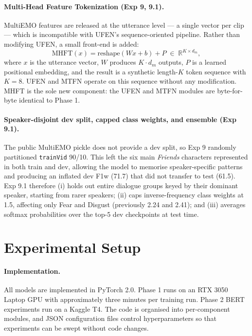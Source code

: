 \documentclass[11pt,twocolumn]{article}
\begin{document}
\paragraph{Multi-Head Feature Tokenization (Exp 9, 9.1).} MultiEMO features are released at the utterance level --- a single vector per clip --- which is incompatible with UFEN's sequence-oriented pipeline. Rather than modifying UFEN, a small front-end is added:
\begin{equation}
\text{MHFT}(x) = \text{reshape}(W x + b) + P \;\in\; \mathbb{R}^{K \times d_m},
\end{equation}
where $x$ is the utterance vector, $W$ produces $K \cdot d_m$ outputs, $P$ is a learned positional embedding, and the result is a synthetic length-$K$ token sequence with $K = 8$. UFEN and MTFN operate on this sequence without any modification. MHFT is the sole new component: the UFEN and MTFN modules are byte-for-byte identical to Phase 1.

\paragraph{Speaker-disjoint dev split, capped class weights, and ensemble (Exp 9.1).} The public MultiEMO pickle does not provide a dev split, so Exp 9 randomly partitioned \texttt{trainVid} 90/10. This left the six main \emph{Friends} characters represented in both train and dev, allowing the model to memorise speaker-specific patterns and producing an inflated dev F1w (71.7) that did not transfer to test (61.5). Exp 9.1 therefore (i) holds out entire dialogue groups keyed by their dominant speaker, starting from rarer speakers; (ii) caps inverse-frequency class weights at 1.5, affecting only Fear and Disgust (previously 2.24 and 2.41); and (iii) averages softmax probabilities over the top-5 dev checkpoints at test time.

\section{Experimental Setup}
\label{sec:setup}

\paragraph{Implementation.} All models are implemented in PyTorch 2.0. Phase 1 runs on an RTX 3050 Laptop GPU with approximately three minutes per training run. Phase 2 BERT experiments run on a Kaggle T4. The code is organised into per-component modules, and JSON configuration files control hyperparameters so that experiments can be swept without code changes.
\end{document}
